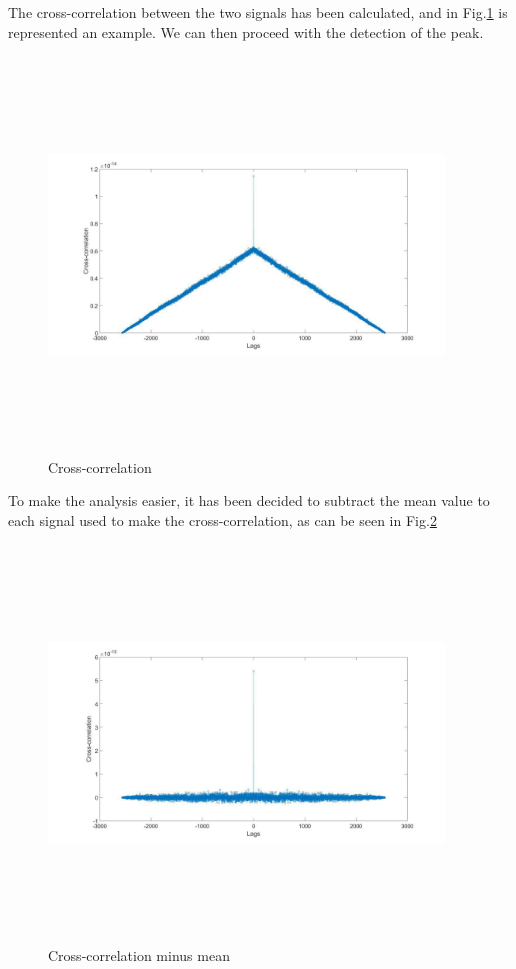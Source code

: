 The cross-correlation between the two signals has been calculated, and in Fig.\ref{fig:xcross} is represented an example. We can then proceed with the detection of the peak.
\begin{figure}[H]
	\centering
	\includegraphics[height=10.5cm, width=10.5cm, keepaspectratio]{img/xcross.jpg}
	\caption{Cross-correlation}\label{fig:xcross}
\end{figure}
To make the analysis easier, it has been decided to subtract the mean value to each signal used to make the cross-correlation, as can be seen in Fig.\ref{fig:xcross-mean}
\begin{figure}[H]
	\centering
	\includegraphics[height=10.5cm, width=10.5cm, keepaspectratio]{img/xcross-mean.jpg}
	\caption{Cross-correlation minus mean}\label{fig:xcross-mean}
\end{figure}
